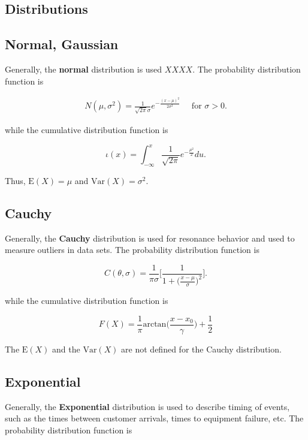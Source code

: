 \documentclass[12pt]{article}
\begin{document}
\begin{center}
\section*{Distributions}
\end{center}

\subsection*{Normal, Gaussian}
\noindent
Generally, the \textbf{normal} distribution is used $XXXX$. The probability distribution function is

\begin{align*}
N(\mu, \sigma^2) = \frac{1}{\sqrt{2 \pi} \sigma} e^{- \frac{(x - \mu)^2}{2 \sigma^2}} \quad \text{ for } \sigma > 0.
\end{align*}

\noindent
while the cumulative distribution function is

\begin{equation*}
\iota(x) = \int_{- \infty}^{x} \frac{1}{\sqrt{2 \pi}} e^{- \frac{\mu^2}{2}} du.
\end{equation*}

\noindent
Thus, $\text{E}(X) = \mu$ and $\text{Var}(X) = \sigma^2$.

\subsection*{Cauchy}
\noindent
Generally, the \textbf{Cauchy} distribution is used for resonance behavior and used to measure outliers in data sets. The probability distribution function is

\begin{equation*}
C(\theta, \sigma) = \frac{1}{\pi \sigma} \Bigg [ \frac{1}{1 + \big ( \frac{x- \mu}{\sigma}\big )^2} \Bigg ].
\end{equation*}

\noindent
while the cumulative distribution function is

\begin{equation*}
F(X) = \frac{1}{\pi} \text{arctan}\big ( \frac{x - x_0}{\gamma}\big ) + \frac{1}{2}
\end{equation*}

\noindent
The $\text{E}(X)$ and the $\text{Var}(X)$ are not defined for the Cauchy distribution.

\subsection*{Exponential}
\noindent
Generally, the \textbf{Exponential} distribution is used to describe timing of events, such as the times between customer arrivals, times to equipment failure, etc. The probability distribution function is
\end{document}
